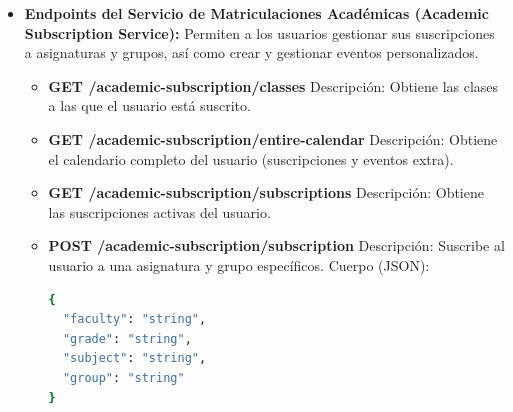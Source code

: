\begin{itemize}
\begin{itemize}
        \item \textbf{GET /schedule-consumer/grades}
        \newline Descripción: Obtiene la lista de todas las titulaciones disponibles.

        \item \textbf{GET /schedule-consumer/subjects-groups}
        \newline Descripción: Obtiene las asignaturas y grupos asociados a una titulación específica.
        \newline Parámetros de consulta: grade (string)

        \item \textbf{GET /schedule-consumer/teacher-classes}
        \newline Descripción: Obtiene las clases impartidas por un profesor, buscando por nombre parcial.
        \newline Parámetros de consulta: partialTeacherName (string)
    \end{itemize}

    \item \textbf{Endpoints del Servicio de Matriculaciones Académicas (Academic Subscription Service):}
    Permiten a los usuarios gestionar sus suscripciones a asignaturas y grupos, así como crear y gestionar eventos personalizados.
    \begin{itemize}
        \item \textbf{GET /academic-subscription/classes}
        \newline Descripción: Obtiene las clases a las que el usuario está suscrito.

        \item \textbf{GET /academic-subscription/entire-calendar}
        \newline Descripción: Obtiene el calendario completo del usuario (suscripciones y eventos extra).

        \item \textbf{GET /academic-subscription/subscriptions}
        \newline Descripción: Obtiene las suscripciones activas del usuario.

        \item \textbf{POST /academic-subscription/subscription}
        \newline Descripción: Suscribe al usuario a una asignatura y grupo específicos.
        \newline Cuerpo (JSON):
\begin{lstlisting}[language=bash]
{
  "faculty": "string",
  "grade": "string",
  "subject": "string",
  "group": "string"
}
\end{lstlisting}


\end{itemize}
\end{itemize}
